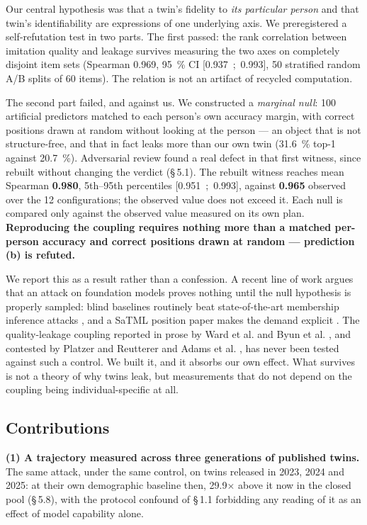 \documentclass[sigconf,anonymous,review]{acmart}
\begin{document}
Our central hypothesis was that a twin's fidelity to \textit{its particular person} and that twin's identifiability are expressions of one underlying axis. We preregistered a self-refutation test in two parts. The first passed: the rank correlation between imitation quality and leakage survives measuring the two axes on completely disjoint item sets (Spearman 0.969, 95~\% CI [0.937~;~0.993], 50 stratified random A/B splits of 60 items). The relation is not an artifact of recycled computation.

The second part failed, and against us. We constructed a \textit{marginal null}: 100 artificial predictors matched to each person's own accuracy margin, with correct positions drawn at random without looking at the person --- an object that is not structure-free, and that in fact leaks more than our own twin (31.6~\% top-1 against 20.7~\%). Adversarial review found a real defect in that first witness, since rebuilt without changing the verdict (\S\,5.1). The rebuilt witness reaches mean Spearman \textbf{0.980}, 5th--95th percentiles [0.951~;~0.993], against \textbf{0.965} observed over the 12 configurations; the observed value does not exceed it. Each null is compared only against the observed value measured on its own plan. \textbf{Reproducing the coupling requires nothing more than a matched per-person accuracy and correct positions drawn at random --- prediction (b) is refuted.}

We report this as a result rather than a confession. A recent line of work argues that an attack on foundation models proves nothing until the null hypothesis is properly sampled: blind baselines routinely beat state-of-the-art membership inference attacks \cite{das2024blind,duan2024membership}, and a SaTML position paper makes the demand explicit \cite{zhang2024satml}. The quality-leakage coupling reported in prose by Ward et al. \cite{ward2025synthmia} and Byun et al. \cite{byun2025riskcontext}, and contested by Platzer and Reutterer \cite{platzer2021holdout} and Adams et al. \cite{adams2025fidelity}, has never been tested against such a control. We built it, and it absorbs our own effect. What survives is not a theory of why twins leak, but measurements that do not depend on the coupling being individual-specific at all.

\subsection{Contributions}

\textbf{(1) A trajectory measured across three generations of published twins.} The same attack, under the same control, on twins released in 2023, 2024 and 2025: at their own demographic baseline then, 29.9$\times$ above it now in the closed pool (\S\,5.8), with the protocol confound of \S\,1.1 forbidding any reading of it as an effect of model capability alone.
\end{document}
